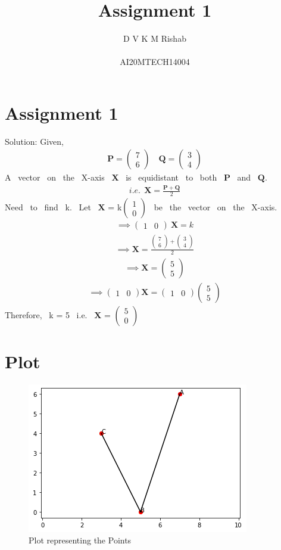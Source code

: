 \documentclass{article}
\title{Assignment 1}
\author{D V K M Rishab \\ \\ AI20MTECH14004}
\date{}
\newcommand{\myvec}[1]{\ensuremath{\begin{pmatrix}#1\end{pmatrix}}}
\begin{document}
\let\vec\mathbf
\maketitle
\section*{Assignment 1}
Solution: 
Given,
\begin{align}
\vec{P} = \myvec{7\\6} \quad
\vec{Q} = \myvec{3\\4}    
\end{align}
A \ vector \ on \ the \ X-axis \ $\vec{X}$ \ is \ equidistant \ to \ both \ $\vec{P}$ \ and \ $\vec{Q}$.
\begin{align}
i.e. \ \ \vec{X} = \frac{{\vec{P}+\vec{Q}}}{2}    
\end{align}
Need \ to \ find \ k. \ 
Let \ $\vec{X}$ = k\myvec{1\\0} \ be \ the \ vector \ on \ the \ X-axis.
\begin{align}
\implies \myvec{1 & 0} \ \vec{X} = k
\end{align}
\begin{align}
\implies \vec{X} = \frac{\myvec{7\\6}+\myvec{3\\4}}{2}    
\end{align}
\begin{align}
\implies \vec{X} = \myvec{5\\5}    
\end{align}
\begin{align}
\implies \myvec{1 & 0}\vec{X} = \myvec{1 & 0}\myvec{5\\5} 
\end{align}
Therefore, \ k = 5 \ i.e. \ $\vec{X}$ = \myvec{5\\0}
\newpage
\section*{Plot}
\begin{figure}[!htb]
    \centering
    \includegraphics[width=\columnwidth]{Assignment1.png}
    \caption{Plot representing the Points}
    \label{Fig.1}
\end{figure}
\end{document}
